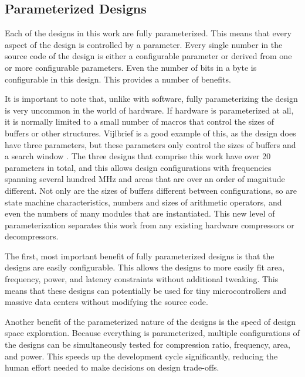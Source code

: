 \documentclass[doublespace,nopageskip]{VTthesis}
\begin{document}
\subsection{Parameterized Designs}\label{ss:parameterized}
Each of the designs in this work are fully parameterized. This means that every aspect of the design is controlled by a parameter. Every single number in the source code of the design is either a configurable parameter or derived from one or more configurable parameters. Even the number of bits in a byte is configurable in this design. This provides a number of benefits.

It is important to note that, unlike with software, fully parameterizing the design is very uncommon in the world of hardware. If hardware is parameterized at all, it is normally limited to a small number of macros that control the sizes of buffers or other structures. Vijlbrief is a good example of this, as the design does have three parameters, but these parameters only control the sizes of buffers and a search window \cite{hdldeflate}. The three designs that comprise this work have over 20 parameters in total, and this allows design configurations with frequencies spanning several hundred MHz and areas that are over an order of magnitude different. Not only are the sizes of buffers different between configurations, so are state machine characteristics, numbers and sizes of arithmetic operators, and even the numbers of many modules that are instantiated. This new level of parameterization separates this work from any existing hardware compressors or decompressors.

The first, most important benefit of fully parameterized designs is that the designs are easily configurable. This allows the designs to more easily fit area, frequency, power, and latency constraints without additional tweaking. This means that these designs can potentially be used for tiny microcontrollers and massive data centers without modifying the source code.

Another benefit of the parameterized nature of the designs is the speed of design space exploration. Because everything is parameterized, multiple configurations of the designs can be simultaneously tested for compression ratio, frequency, area, and power. This speeds up the development cycle significantly, reducing the human effort needed to make decisions on design trade-offs.
\end{document}
